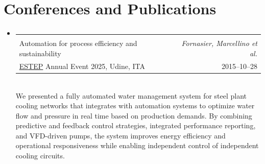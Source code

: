 \documentclass[a4paper,english]{article} %
\makeatletter
\newcommand{\resumeSubheading}[4]{
  \vspace{2pt}\item
    \begin{tabular*}{0.97\textwidth}{l@{\extracolsep{\fill}}r}
      \textbf{#1} & \textit{\small #2} \\
      #3 & \small #4 \\
    \end{tabular*}\vspace{5pt}\\
}
\makeatother
\begin{document}
\begin{itemize}[leftmargin=*]
		 \vspace{0.5em}

	\end{itemize}

\section{Conferences and Publications}
  \begin{itemize}[leftmargin=*]
	  \resumeSubheading
      		{\shortstack[l]{Intelligent water management in steelmaking:\\Automation for process efficiency and sustainability}}{Fornasier, Marcellino et al.}
      		{\href{https://www.estep.eu}{ESTEP} Annual Event 2025, Udine, ITA}{2015--10--28}
			We presented a fully automated water management system for steel plant cooling networks that integrates with automation systems to optimize water flow and pressure in real time based on production demands. By combining predictive and feedback control strategies, integrated performance reporting, and VFD-driven pumps, the system improves energy efficiency and operational responsiveness while enabling independent control of independent cooling circuits.
  \end{itemize}
\end{document}
